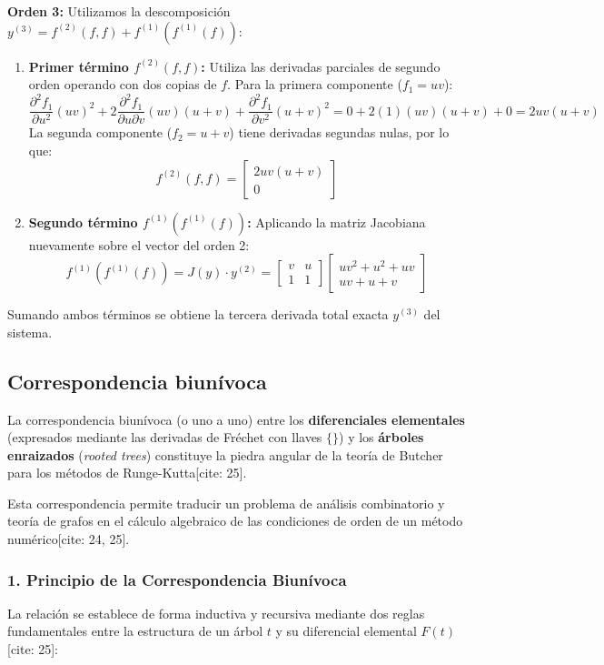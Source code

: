 \textbf{Orden 3:}
Utilizamos la descomposición $y^{(3)} = f^{(2)}(f, f) + f^{(1)}(f^{(1)}(f))$:
\begin{enumerate}
    \item \textbf{Primer término $f^{(2)}(f, f)$:} Utiliza las derivadas parciales de segundo orden operando con dos copias de $f$. Para la primera componente ($f_1 = uv$):
    \[
    \frac{\partial^2 f_1}{\partial u^2}(uv)^2 + 2\frac{\partial^2 f_1}{\partial u \partial v}(uv)(u+v) + \frac{\partial^2 f_1}{\partial v^2}(u+v)^2 = 0 + 2(1)(uv)(u+v) + 0 = 2uv(u+v)
    \]
    La segunda componente ($f_2 = u+v$) tiene derivadas segundas nulas, por lo que:
    \[
    f^{(2)}(f, f) = \begin{bmatrix} 2uv(u+v) \\ 0 \end{bmatrix}
    \]
    \item \textbf{Segundo término $f^{(1)}(f^{(1)}(f))$:} Aplicando la matriz Jacobiana nuevamente sobre el vector del orden 2:
    \[
    f^{(1)}(f^{(1)}(f)) = J(y) \cdot y^{(2)} = \begin{bmatrix} v & u \\ 1 & 1 \end{bmatrix} \begin{bmatrix} uv^2 + u^2 + uv \\ uv + u + v \end{bmatrix}
    \]
\end{enumerate}
Sumando ambos términos se obtiene la tercera derivada total exacta $y^{(3)}$ del sistema.


\subsection*{Correspondencia biunívoca}
La correspondencia biunívoca (o uno a uno) entre los \textbf{diferenciales elementales} (expresados mediante las derivadas de Fréchet con llaves $\{\}$) y los \textbf{árboles enraizados} (\textit{rooted trees}) constituye la piedra angular de la teoría de Butcher para los métodos de Runge-Kutta[cite: 25]. 

Esta correspondencia permite traducir un problema de análisis combinatorio y teoría de grafos en el cálculo algebraico de las condiciones de orden de un método numérico[cite: 24, 25].

\subsubsection*{1. Principio de la Correspondencia Biunívoca}
La relación se establece de forma inductiva y recursiva mediante dos reglas fundamentales entre la estructura de un árbol $t$ y su diferencial elemental $F(t)$[cite: 25]:

